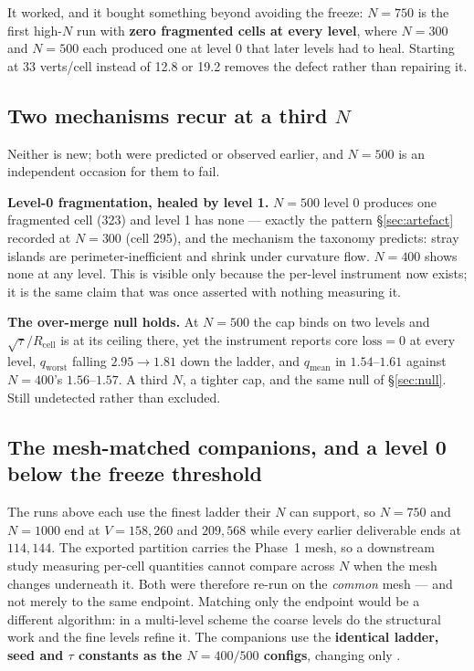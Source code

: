 \documentclass[11pt,a4paper]{article}
\begin{document}
It worked, and it bought something beyond avoiding the freeze: \(N{=}750\) is the
first high-\(N\) run with \textbf{zero fragmented cells at every level}, where
\(N{=}300\) and \(N{=}500\) each produced one at level 0 that later levels had to
heal. Starting at 33 verts/cell instead of 12.8 or 19.2 removes the defect rather
than repairing it.

\subsection*{Two mechanisms recur at a third \(N\)}

Neither is new; both were predicted or observed earlier, and \(N{=}500\) is an
independent occasion for them to fail.

\textbf{Level-0 fragmentation, healed by level 1.} \(N{=}500\) level 0 produces
one fragmented cell (323) and level 1 has none --- exactly the pattern
\S\ref{sec:artefact} recorded at \(N{=}300\) (cell 295), and the mechanism the
taxonomy predicts: stray islands are perimeter-inefficient and shrink under
curvature flow. \(N{=}400\) shows none at any level. This is visible only because
the per-level instrument now exists; it is the same claim that was once asserted
with nothing measuring it.

\textbf{The over-merge null holds.} At \(N{=}500\) the cap binds on two levels and
\(\sqrt{\tau}/R_{\mathrm{cell}}\) is at its ceiling there, yet the instrument
reports \(\text{core loss} = 0\) at every level, \(q_{\mathrm{worst}}\) falling
\(2.95 \to 1.81\) down the ladder, and \(q_{\mathrm{mean}}\) in
\(1.54\text{--}1.61\) against \(N{=}400\)'s \(1.56\text{--}1.57\). A third \(N\),
a tighter cap, and the same null of \S\ref{sec:null}. Still undetected rather
than excluded.

\subsection*{The mesh-matched companions, and a level 0 below the freeze threshold}
\label{sec:meshmatched}

The runs above each use the finest ladder their \(N\) can support, so \(N{=}750\)
and \(N{=}1000\) end at \(V{=}158{,}260\) and \(209{,}568\) while every earlier
deliverable ends at \(114{,}144\). The exported partition carries the Phase~1
mesh, so a downstream study measuring per-cell quantities cannot compare across
\(N\) when the mesh changes underneath it. Both were therefore re-run on the
\emph{common} mesh --- and not merely to the same endpoint. Matching only the
endpoint would be a different algorithm: in a multi-level scheme the coarse levels
do the structural work and the fine levels refine it. The companions use the
\textbf{identical ladder, seed and \(\tau\) constants as the \(N{=}400/500\)
configs}, changing only .
\end{document}
